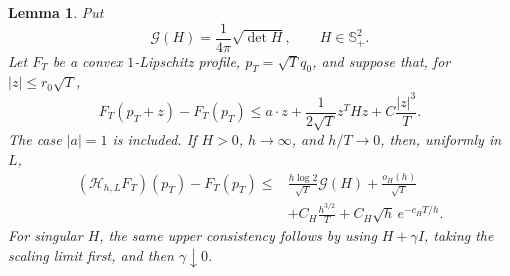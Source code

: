 \documentclass[11pt,reqno]{amsart}
\theoremstyle{plain}
\newtheorem{lemma}[theorem]{Lemma}
\theoremstyle{definition}
\theoremstyle{remark}
\numberwithin{equation}{section}
\newcommand{\1}{\mathbf 1}
\begin{document}
\begin{lemma}\label{lem:localized-upper-consistency}
Put
\begin{equation}
\mathcal G(H)=\frac1{4\pi}\sqrt{\det H},\qquad H\in\mathbb S_ +^2.
\tag{33}
\end{equation}
Let $F_ T$ be a convex $1$-Lipschitz profile, $p_ T=\sqrt Tq_ 0$,
and suppose that, for $|z|\leq r_ 0\sqrt T$,
\begin{equation}
F_ T(p_ T+z)-F_ T(p_ T)
\leq a\cdot z+\frac1{2\sqrt T}z^THz+C\frac{|z|^3}{T}.
\tag{33a}
\end{equation}
The case $|a|=1$ is included.  If $H>0$, $h\to\infty$,
and $h/T\to0$, then, uniformly in $L$,
\begin{equation}
\begin{split}
(\mathcal H_ {h,L}F_ T)(p_ T)-F_ T(p_ T)
\leq{}&\frac{h\log2}{\sqrt T}\mathcal G(H)+\frac{o_ H(h)}{\sqrt T}\\
&+C_ H\frac{h^{3/2}}T+C_ H\sqrt h\,e^{-c_ HT/h}.                  
\end{split}
\tag{33b}
\end{equation}
For singular $H$, the same upper consistency follows by using
$H+\gamma I$, taking the scaling limit first, and then
$\gamma\downarrow0$.

\end{lemma}
\end{document}
